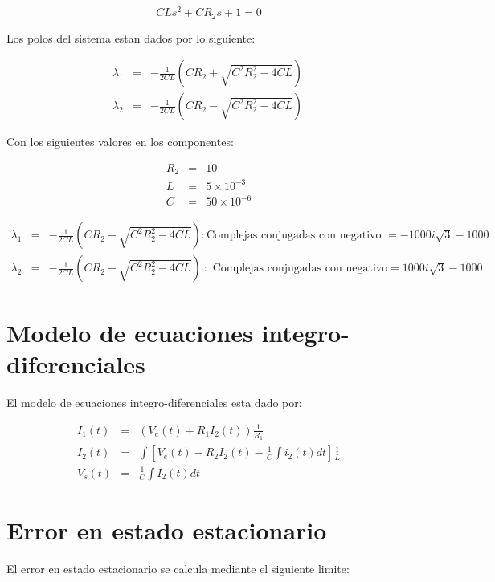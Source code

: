 \documentclass[letterpaper,11pt]{article}
\begin{document}
\begin{equation*}
CLs^{2}+CR_{2}s+1=0
\end{equation*}

Los polos del sistema estan dados por lo siguiente:

\begin{eqnarray*}
\lambda _{1} &=&-\frac{1}{2CL}\left( CR_{2}+\sqrt{C^{2}R_{2}^{2}-4CL}\right)
\\
\lambda _{2} &=&-\frac{1}{2CL}\left( CR_{2}-\sqrt{C^{2}R_{2}^{2}-4CL}\right)
\ 
\end{eqnarray*}

\bigskip Con los siguientes valores en los componentes:

\begin{eqnarray*}
R_{2} &=&10 \\
L &=&5\times 10^{-3} \\
C &=&50\times 10^{-6}
\end{eqnarray*}

\begin{eqnarray*}
\lambda _{1} &=&-\frac{1}{2CL}\left( CR_{2}+\sqrt{C^{2}R_{2}^{2}-4CL}\right)
:\text{Complejas conjugadas con negativo }=-1000i\sqrt{3}-1000 \\
\lambda _{2} &=&-\frac{1}{2CL}\left( CR_{2}-\sqrt{C^{2}R_{2}^{2}-4CL}\right)
\ :\text{ Complejas conjugadas con negativo}=1000i\sqrt{3}-1000
\end{eqnarray*}

\section{Modelo de ecuaciones integro-diferenciales}

El modelo de ecuaciones integro-diferenciales esta dado por:

\begin{eqnarray*}
I_{1}(t) &=&(V_{e}(t)+R_{1}I_{2}(t))\frac{1}{R_{1}} \\
I_{2}(t) &=&\int \left[ V_{e}(t)-R_{2}I_{2}(t)-\frac{1}{C}\int i_{2}(t)dt%
\right] \frac{1}{L} \\
V_{s}(t) &=&\frac{1}{C}\int I_{2}(t)dt
\end{eqnarray*}

\section{Error en estado estacionario}

El error en estado estacionario se calcula mediante el siguiente limite:
\end{document}
